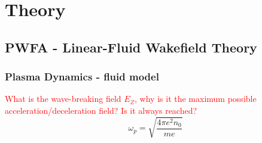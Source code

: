 \chapter{Theory}


\section{PWFA - Linear-Fluid Wakefield Theory}
\subsection{Plasma Dynamics - fluid model}
\textcolor{red}{What is the wave-breaking field $E_Z$, why is it the maximum possible acceleration/deceleration field? Is it always reached?}
\begin{equation}
\omega_p=\sqrt{\frac{4\pi e^2n_0}{me}}
\end{equation}
